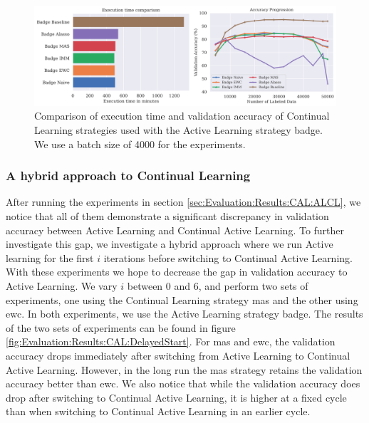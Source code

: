 \begin{figure}[h]
    \centering
    \includegraphics[width=\linewidth]{images/results_CAL/Badge_CAL_4000b.png}
    \caption[Continual Active Learning \gls{badge} 4000 batch size]{Comparison of execution time and validation accuracy of Continual Learning strategies used with the Active Learning strategy
    \gls{badge}. We use a batch size of 4000 for the experiments.}
    \label{fig:Evaluation:Results:CAL:Badge4000}
\end{figure}

\subsubsection{A hybrid approach to Continual Learning}
\label{sec:Evaluation:Results:CAL:Hybrid}
After running the experiments in section \ref{sec:Evaluation:Results:CAL:ALCL}, we notice that all of them demonstrate a significant discrepancy in validation accuracy between Active Learning and Continual Active Learning. To further investigate this gap,
we investigate a hybrid approach where we run Active learning for the first $i$ iterations before switching to Continual Active Learning. With these experiments we hope to decrease the gap in validation accuracy to Active Learning. We vary $i$ between 0 and 6,
and perform two sets of experiments, one using the Continual Learning strategy \gls{mas} and the other using \gls{ewc}. In both experiments, we use the Active Learning strategy \gls{badge}. The results of the two sets of experiments can be found in figure 
\ref{fig:Evaluation:Results:CAL:DelayedStart}. For \gls{mas} and \gls{ewc}, the validation accuracy drops immediately after switching from Active Learning to Continual Active Learning. However, in the long run the \gls{mas} strategy retains the validation accuracy better than \gls{ewc}.
We also notice that while the validation accuracy does drop after switching to Continual Active Learning, it is higher at a fixed cycle than when switching to Continual Active Learning in an earlier cycle. \par

